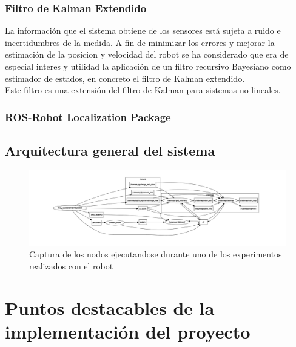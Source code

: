 \subsubsection{Filtro de Kalman Extendido}
La información que el sistema obtiene de los sensores está sujeta a ruido e incertidumbres de la medida. A fin de minimizar los errores y mejorar la estimación de la posicion y velocidad del robot se ha 
considerado que era de especial interes y utilidad la aplicación de un filtro recursivo Bayesiano como estimador de estados, en concreto el filtro de Kalman extendido. \\
Este filtro es una extensión del filtro de Kalman para sistemas no lineales.

\subsubsection{ROS-Robot Localization Package}

\newpage

\subsection{Arquitectura general del sistema}

\begin{figure}[!ht]
    \centering
    \includegraphics[width=\textwidth]{images/rqt_graphs/graph_RTABMAP.pdf}
    \caption{Captura de los nodos ejecutandose durante uno de los experimentos realizados con el robot}
    \label{rqt01}
\end{figure}

\section{Puntos destacables de la implementación del proyecto}

